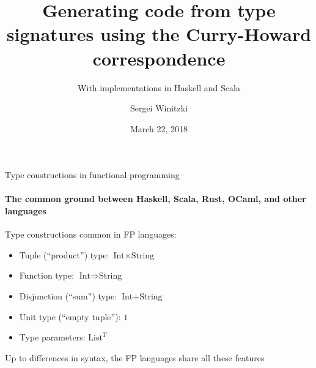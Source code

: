 \documentclass[english]{beamer}
\title[Generating code with Curry-Howard]{Generating code from type signatures
using the Curry-Howard correspondence}
\subtitle{With implementations in Haskell and Scala}
\author{Sergei Winitzki}
\date{March 22, 2018}
\institute[BAHUG]{Bay Area Haskell Users' Group}
\begin{document}
\frame{\titlepage}
\begin{frame}{Type constructions in functional programming}


\framesubtitle{The common ground between Haskell, Scala, Rust, OCaml, and other
languages}

Type constructions common in FP languages:
\begin{itemize}
\item Tuple (``product'') type: $\text{Int}\times\text{String}$
\item Function type: $\text{Int}\Rightarrow\text{String}$
\item Disjunction (``sum'') type: $\text{Int}+\text{String}$
\item Unit type (``empty tuple''): $1$
\item Type parameters: $\text{List}^{T}$
\end{itemize}
Up to differences in syntax, the FP languages share all these features
\end{frame}
\end{document}
